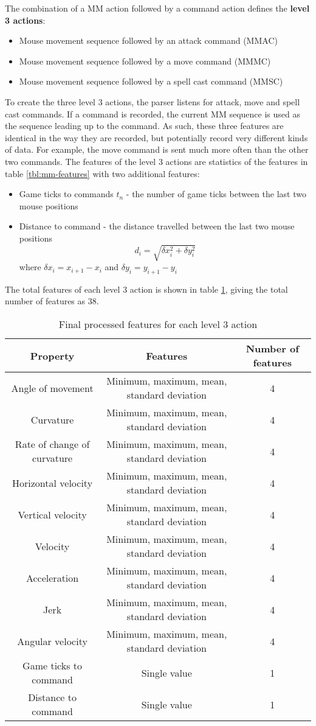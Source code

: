\documentclass[Report.tex]{subfiles}
\begin{document}
The combination of a MM action followed by a command action defines the \textbf{level 3 actions}:
\begin{itemize}
\item Mouse movement sequence followed by an attack command (MMAC)
\item Mouse movement sequence followed by a move command (MMMC)
\item Mouse movement sequence followed by a spell cast command (MMSC)
\end{itemize}
To create the three level 3 actions, the parser listens for attack, move and spell cast commands. If a command is recorded, the current MM sequence is used as the sequence leading up to the command. As such, these three features are identical in the way they are recorded, but potentially record very different kinds of data. For example, the move command is sent much more often than the other two commands. The features of the level 3 actions are statistics of the features in table \ref{tbl:mm-features} with two additional features:
\begin{itemize}
\item Game ticks to commands $t_n$ - the number of game ticks between the last two mouse positions
\item Distance to command - the distance travelled between the last two mouse positions
\begin{equation}
d_i = \sqrt{\delta x_{i}^2 + \delta y_{i}^2}
\end{equation} 
where $\delta x_i = x_{i+1} - x_i$ and $\delta y_i = y_{i+1} - y_i$
\end{itemize}

The total features of each level 3 action is shown in table \ref{tbl-level3features}, giving the total number of features as 38. 
\newcommand{\fourfeatures}[1]{#1 & Minimum, maximum, mean, standard deviation & 4 \\ \hline}
\begin{table}[H]
\renewcommand*{\arraystretch}{1.5}
\centering
\begin{tabular}{| c | c | c |}
\hline
\textbf{Property} & \textbf{Features} & \textbf{Number of features} \\ \hline
\fourfeatures{Angle of movement}
\fourfeatures{Curvature}
\fourfeatures{Rate of change of curvature}
\fourfeatures{Horizontal velocity}
\fourfeatures{Vertical velocity}
\fourfeatures{Velocity}
\fourfeatures{Acceleration}
\fourfeatures{Jerk}
\fourfeatures{Angular velocity}
Game ticks to command & Single value & 1 \\ \hline
Distance to command & Single value & 1 \\ \hline
\end{tabular}
\caption{Final processed features for each level 3 action}
\label{tbl-level3features}
\end{table}
\end{document}
